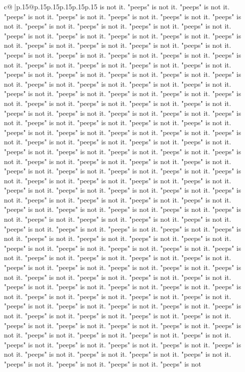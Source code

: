 \documentclass{article}
\begin{document}
{\begin{supertabular}{c@{$\;$}|p{.15\linewidth}@{}p{.15\linewidth}p{.15\linewidth}p{.15\linewidth}p{.15\linewidth}p{.15\linewidth}}
{{{is not it. "peeps" is not it. "peeps" is not it. "peeps" is not it. "peeps" is not it. "peeps" is not it. "peeps" is not it. "peeps" is not it. "peeps" is not it. "peeps" is not it. "peeps" is not it. "peeps" is not it. "peeps" is not it. "peeps" is not it. "peeps" is not it. "peeps" is not it. "peeps" is not it. "peeps" is not it. "peeps" is not it. "peeps" is not it. "peeps" is not it. "peeps" is not it. "peeps" is not it. "peeps" is not it. "peeps" is not it. "peeps" is not it. "peeps" is not it. "peeps" is not it. "peeps" is not it. "peeps" is not it. "peeps" is not it. "peeps" is not it. "peeps" is not it. "peeps" is not it. "peeps" is not it. "peeps" is not it. "peeps" is not it. "peeps" is not it. "peeps" is not it. "peeps" is not it. "peeps" is not it. "peeps" is not it. "peeps" is not it. "peeps" is not it. "peeps" is not it. "peeps" is not it. "peeps" is not it. "peeps" is not it. "peeps" is not it. "peeps" is not it. "peeps" is not it. "peeps" is not it. "peeps" is not it. "peeps" is not it. "peeps" is not it. "peeps" is not it. "peeps" is not it. "peeps" is not it. "peeps" is not it. "peeps" is not it. "peeps" is not it. "peeps" is not it. "peeps" is not it. "peeps" is not it. "peeps" is not it. "peeps" is not it. "peeps" is not it. "peeps" is not it. "peeps" is not it. "peeps" is not it. "peeps" is not it. "peeps" is not it. "peeps" is not it. "peeps" is not it. "peeps" is not it. "peeps" is not it. "peeps" is not it. "peeps" is not it. "peeps" is not it. "peeps" is not it. "peeps" is not it. "peeps" is not it. "peeps" is not it. "peeps" is not it. "peeps" is not it. "peeps" is not it. "peeps" is not it. "peeps" is not it. "peeps" is not it. "peeps" is not it. "peeps" is not it. "peeps" is not it. "peeps" is not it. "peeps" is not it. "peeps" is not it. "peeps" is not it. "peeps" is not it. "peeps" is not it. "peeps" is not it. "peeps" is not it. "peeps" is not it. "peeps" is not it. "peeps" is not it. "peeps" is not it. "peeps" is not it. "peeps" is not it. "peeps" is not it. "peeps" is not it. "peeps" is not it. "peeps" is not it. "peeps" is not it. "peeps" is not it. "peeps" is not it. "peeps" is not it. "peeps" is not it. "peeps" is not it. "peeps" is not it. "peeps" is not it. "peeps" is not it. "peeps" is not it. "peeps" is not it. "peeps" is not it. "peeps" is not it. "peeps" is not it. "peeps" is not it. "peeps" is not it. "peeps" is not it. "peeps" is not it. "peeps" is not it. "peeps" is not it. "peeps" is not it. "peeps" is not it. "peeps" is not it. "peeps" is not it. "peeps" is not it. "peeps" is not it. "peeps" is not it. "peeps" is not it. "peeps" is not it. "peeps" is not it. "peeps" is not it. "peeps" is not it. "peeps" is not it. "peeps" is not it. "peeps" is not it. "peeps" is not it. "peeps" is not it. "peeps" is not it. "peeps" is not it. "peeps" is not it. "peeps" is not it. "peeps" is not it. "peeps" is not it. "peeps" is not it. "peeps" is not it. "peeps" is not it. "peeps" is not it. "peeps" is not it. "peeps" is not it. "peeps" is not it. "peeps" is not it. "peeps" is not it. "peeps" is not it. "peeps" is not it. "peeps" is not it. "peeps" is not it. "peeps" is not it. "peeps" is not it. "peeps" is not }}}
\end{supertabular}}
\end{document}
